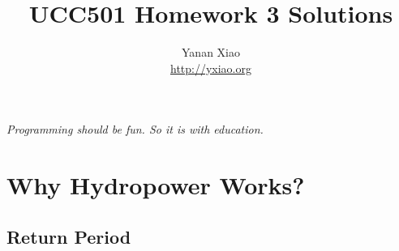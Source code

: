 \documentclass[12pt]{article}
\begin{document}
\title{UCC501 Homework 3 Solutions}
\author{Yanan Xiao
\\\url{http://yxiao.org}}
\maketitle{}



\emph{Programming should be fun. So it is with education.}
\section{Why Hydropower Works?}
\label{sec:why-hydropower-works}

\subsection{Return Period}
\label{sec:return-period}
\end{document}
